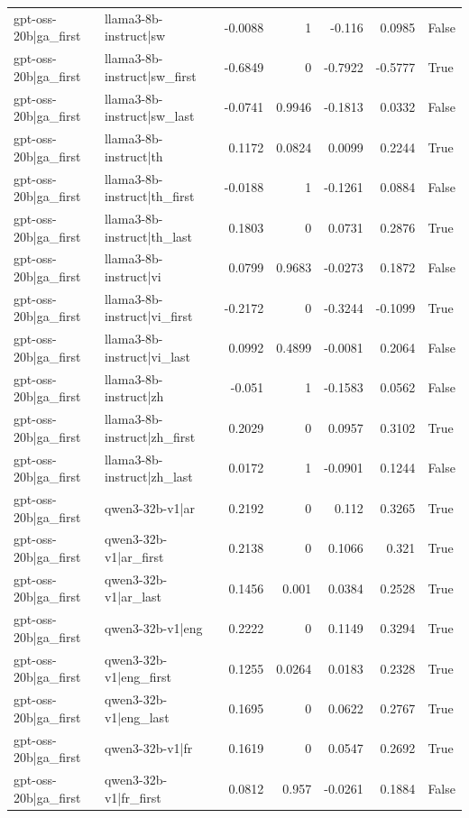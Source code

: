 \begin{table}
\begin{tabular}{l l r r r r l}
gpt-oss-20b|ga_first & llama3-8b-instruct|sw & -0.0088 & 1 & -0.116 & 0.0985 & False \\
gpt-oss-20b|ga_first & llama3-8b-instruct|sw_first & -0.6849 & 0 & -0.7922 & -0.5777 & True \\
gpt-oss-20b|ga_first & llama3-8b-instruct|sw_last & -0.0741 & 0.9946 & -0.1813 & 0.0332 & False \\
gpt-oss-20b|ga_first & llama3-8b-instruct|th & 0.1172 & 0.0824 & 0.0099 & 0.2244 & True \\
gpt-oss-20b|ga_first & llama3-8b-instruct|th_first & -0.0188 & 1 & -0.1261 & 0.0884 & False \\
gpt-oss-20b|ga_first & llama3-8b-instruct|th_last & 0.1803 & 0 & 0.0731 & 0.2876 & True \\
gpt-oss-20b|ga_first & llama3-8b-instruct|vi & 0.0799 & 0.9683 & -0.0273 & 0.1872 & False \\
gpt-oss-20b|ga_first & llama3-8b-instruct|vi_first & -0.2172 & 0 & -0.3244 & -0.1099 & True \\
gpt-oss-20b|ga_first & llama3-8b-instruct|vi_last & 0.0992 & 0.4899 & -0.0081 & 0.2064 & False \\
gpt-oss-20b|ga_first & llama3-8b-instruct|zh & -0.051 & 1 & -0.1583 & 0.0562 & False \\
gpt-oss-20b|ga_first & llama3-8b-instruct|zh_first & 0.2029 & 0 & 0.0957 & 0.3102 & True \\
gpt-oss-20b|ga_first & llama3-8b-instruct|zh_last & 0.0172 & 1 & -0.0901 & 0.1244 & False \\
gpt-oss-20b|ga_first & qwen3-32b-v1|ar & 0.2192 & 0 & 0.112 & 0.3265 & True \\
gpt-oss-20b|ga_first & qwen3-32b-v1|ar_first & 0.2138 & 0 & 0.1066 & 0.321 & True \\
gpt-oss-20b|ga_first & qwen3-32b-v1|ar_last & 0.1456 & 0.001 & 0.0384 & 0.2528 & True \\
gpt-oss-20b|ga_first & qwen3-32b-v1|eng & 0.2222 & 0 & 0.1149 & 0.3294 & True \\
gpt-oss-20b|ga_first & qwen3-32b-v1|eng_first & 0.1255 & 0.0264 & 0.0183 & 0.2328 & True \\
gpt-oss-20b|ga_first & qwen3-32b-v1|eng_last & 0.1695 & 0 & 0.0622 & 0.2767 & True \\
gpt-oss-20b|ga_first & qwen3-32b-v1|fr & 0.1619 & 0 & 0.0547 & 0.2692 & True \\
gpt-oss-20b|ga_first & qwen3-32b-v1|fr_first & 0.0812 & 0.957 & -0.0261 & 0.1884 & False \\

\end{tabular}
\end{table}
